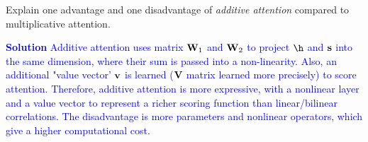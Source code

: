 \begin{parts}
\begin{subparts}
    \subpart[2] Explain one advantage and one disadvantage of \textit{additive attention} compared to multiplicative attention.
    
    \textcolor{blue}{
        \textbf{Solution} Additive attention uses matrix $\mathbf{W}_1$ and $\mathbf{W}_2$ to project $\h$ and $\mathbf{s}$ into the same dimension, where their sum is passed into a non-linearity. Also, an additional "value vector' $\mathbf{v}$ is learned ($\mathbf{V}$ matrix learned more precisely) to score attention. Therefore, additive attention is more expressive, with a nonlinear layer and a value vector to represent a richer scoring function than linear/bilinear correlations. The disadvantage is more parameters and nonlinear operators, which give a higher computational cost.
    }
    
    \end{subparts}
    
\end{parts}

